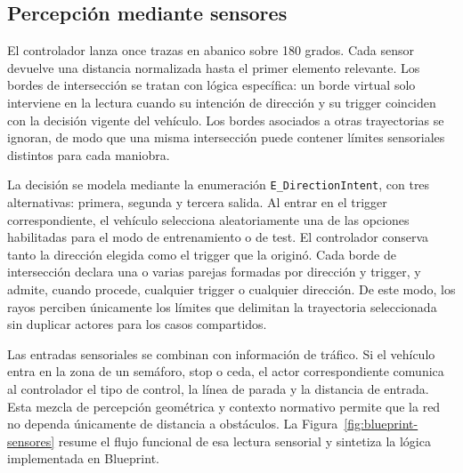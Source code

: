 \subsection{Percepción mediante sensores}

El controlador lanza once trazas en abanico sobre 180 grados. Cada sensor devuelve una distancia normalizada hasta el primer elemento relevante. Los bordes de intersección se tratan con lógica específica: un borde virtual solo interviene en la lectura cuando su intención de dirección y su trigger coinciden con la decisión vigente del vehículo. Los bordes asociados a otras trayectorias se ignoran, de modo que una misma intersección puede contener límites sensoriales distintos para cada maniobra.

La decisión se modela mediante la enumeración \texttt{E\_DirectionIntent}, con tres alternativas: primera, segunda y tercera salida. Al entrar en el trigger correspondiente, el vehículo selecciona aleatoriamente una de las opciones habilitadas para el modo de entrenamiento o de test. El controlador conserva tanto la dirección elegida como el trigger que la originó. Cada borde de intersección declara una o varias parejas formadas por dirección y trigger, y admite, cuando procede, cualquier trigger o cualquier dirección. De este modo, los rayos perciben únicamente los límites que delimitan la trayectoria seleccionada sin duplicar actores para los casos compartidos.

Las entradas sensoriales se combinan con información de tráfico. Si el vehículo entra en la zona de un semáforo, stop o ceda, el actor correspondiente comunica al controlador el tipo de control, la línea de parada y la distancia de entrada. Esta mezcla de percepción geométrica y contexto normativo permite que la red no dependa únicamente de distancia a obstáculos. La Figura~\ref{fig:blueprint-sensores} resume el flujo funcional de esa lectura sensorial y sintetiza la lógica implementada en Blueprint.

